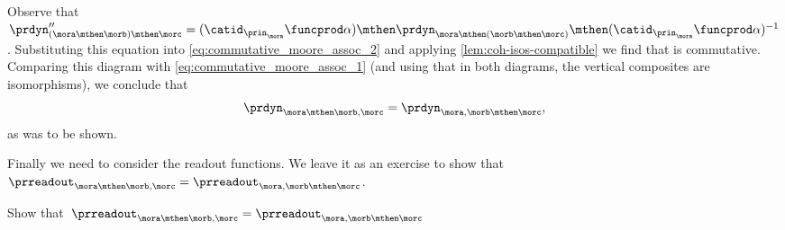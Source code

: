 %
Observe that~$\prdyn''_{(\mora \mthen \morb) \mthen \morc} =  (\catid_{\prin_{\mora}} \funcprod \alpha) \mthen \prdyn_{\mora \mthen (\morb \mthen \morc)} \mthen (\catid_{\prin_{\mora}} \funcprod \alpha)^{-1}$.
Substituting this equation into \cref{eq:commutative_moore_assoc_2} and applying \cref{lem:coh-isos-compatible} we find that
%
%
is commutative.
Comparing this diagram with \cref{eq:commutative_moore_assoc_1} (and using that in both diagrams, the vertical composites are isomorphisms), we conclude that
\begin{equation*}
    \prdyn_{\mora \mthen \morb, \morc} = \prdyn_{\mora, \morb \mthen \morc},
\end{equation*}
as was to be shown.

Finally we need to consider the readout functions.
We leave it as an exercise to show that~$\prreadout_{\mora \mthen \morb, \morc} = \prreadout_{\mora, \morb \mthen \morc}$.

\begin{exercise}
    Show that~$\prreadout_{\mora \mthen \morb, \morc} = \prreadout_{\mora, \morb \mthen \morc}$
\end{exercise}
\begin{solution}
\end{solution}


%

